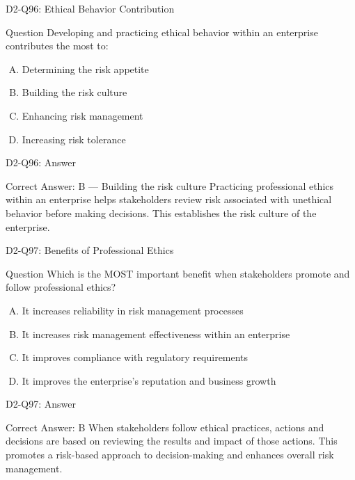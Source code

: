 \documentclass{beamer}
\begin{document}
	\begin{frame}{D2-Q96: Ethical Behavior Contribution}
		\begin{block}{Question}
			Developing and practicing ethical behavior within an enterprise contributes the most to:
		\end{block}
		\begin{enumerate}[(A)]
			\item Determining the risk appetite
			\item Building the risk culture
			\item Enhancing risk management
			\item Increasing risk tolerance
		\end{enumerate}
	\end{frame}
	\begin{frame}{D2-Q96: Answer}
		\begin{block}{Correct Answer: B --- Building the risk culture}
			Practicing professional ethics within an enterprise helps stakeholders review risk associated with unethical behavior before making decisions. This establishes the risk culture of the enterprise.
		\end{block}
	\end{frame}
	
	\begin{frame}{D2-Q97: Benefits of Professional Ethics}
		\begin{block}{Question}
			Which is the MOST important benefit when stakeholders promote and follow professional ethics?
		\end{block}
		\begin{enumerate}[(A)]
			\item It increases reliability in risk management processes
			\item It increases risk management effectiveness within an enterprise
			\item It improves compliance with regulatory requirements
			\item It improves the enterprise's reputation and business growth
		\end{enumerate}
	\end{frame}
	\begin{frame}{D2-Q97: Answer}
		\begin{block}{Correct Answer: B}
			When stakeholders follow ethical practices, actions and decisions are based on reviewing the results and impact of those actions. This promotes a risk-based approach to decision-making and enhances overall risk management.
		\end{block}
	\end{frame}
	
\end{document}
